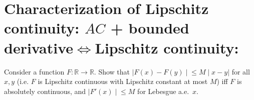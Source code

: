 \section{\texorpdfstring{Characterization of Lipschitz continuity: \(AC\) + bounded derivative\(\Leftrightarrow\)Lipschitz continuity:}{Characterization of Lipschitz continuity: AC + bounded derivative\textbackslash LeftrightarrowLipschitz continuity:}}\label{characterization-of-lipschitz-continuity-ac-bounded-derivativeifflipschitz-continuity}

Consider a function \(F:\mathbb{R}\rightarrow\mathbb{R}\). Show that \(\left. |F(x) - F(y) \middle| \leq M \middle| x - y| \right.\) for all \(x,y\) (i.e. \(F\) is Lipschitz continuous with Lipschitz constant at most \(M\)) iff \(F\) is absolutely continuous, and \(\left. |F'(x) \middle| \leq M \right.\) for Lebesgue a.e.~\(x\).

